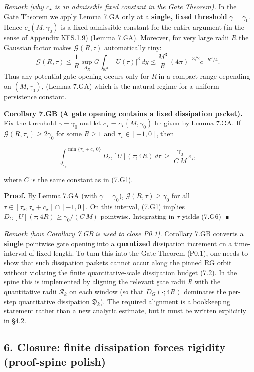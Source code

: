 \documentclass[
  11pt,
]{article}
\begin{document}
\emph{Remark (why \(c_\star\) is an admissible fixed constant in the Gate Theorem).} In the Gate Theorem we apply Lemma 7.GA only at a \textbf{single, fixed threshold} \(\gamma=\gamma_0\). Hence \(c_\star(M,\gamma_0)\) is a fixed admissible constant for the entire argument (in the sense of Appendix NFS.1.9) (Lemma 7.GA). Moreover, for very large radii \(R\) the Gaussian factor makes \(\mathcal G(R,\tau)\) automatically tiny: \[
\mathcal G(R,\tau)\le \frac1R\sup_{A_R}G\int_{\mathbb R^3}|U(\tau)|^3\,dy
\le \frac{M^3}{R}\,(4\pi)^{-3/2}e^{-R^2/4}.
\] Thus any potential gate opening occurs only for \(R\) in a compact range depending on \((M,\gamma_0)\), (Lemma 7.GA) which is the natural regime for a uniform persistence constant.

\textbf{Corollary 7.GB (A gate opening contains a fixed dissipation packet).} Fix the threshold \(\gamma=\gamma_0\) and let \(c_\star=c_\star(M,\gamma_0)\) be given by Lemma 7.GA. If \(\mathcal G(R,\tau_\star)\ge 2\gamma_0\) for some \(R\ge1\) and \(\tau_\star\in[-1,0]\), then

\begin{equation}
\int_{\tau_\star}^{\min\{\tau_\star+c_\star,0\}} D_G[U](\tau;4R)\,d\tau
\ \ge\ \frac{\gamma_0}{C\,M}\,c_\star,
\tag{7.G6}
\end{equation}

where \(C\) is the same constant as in (7.G1).

\textbf{Proof.} By Lemma 7.GA (with \(\gamma=\gamma_0\)), \(\mathcal G(R,\tau)\ge\gamma_0\) for all \(\tau\in[\tau_\star,\tau_\star+c_\star]\cap[-1,0]\). On this interval, (7.G1) implies \(D_G[U](\tau;4R)\ge \gamma_0/(C\,M)\) pointwise. Integrating in \(\tau\) yields (7.G6). ∎

\emph{Remark (how Corollary 7.GB is used to close P0.1).} Corollary 7.GB converts a \textbf{single} pointwise gate opening into a \textbf{quantized} dissipation increment on a time-interval of fixed length. To turn this into the Gate Theorem (P0.1), one needs to show that such dissipation packets cannot occur along the pinned RG orbit without violating the finite quantitative-scale dissipation budget (7.2). In the spine this is implemented by aligning the relevant gate radii \(R\) with the quantitative radii \(\mathcal R_k\) on each window (so that \(D_G(\cdot;4R)\) dominates the per-step quantitative dissipation \(\mathfrak D_k\)). The required alignment is a bookkeeping statement rather than a new analytic estimate, but it must be written explicitly in §4.2.

\hypertarget{closure-finite-dissipation-forces-rigidity-proof-spine-polish}{%
\subsection{6. Closure: finite dissipation forces rigidity (proof-spine polish)}\label{closure-finite-dissipation-forces-rigidity-proof-spine-polish}}
\end{document}
